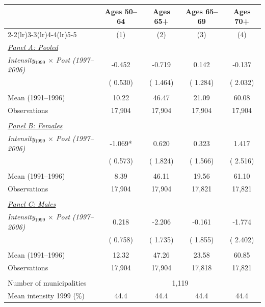 \begin{tabular}{lcccc} \hline \hline
& \multicolumn{1}{c}{Ages 50--64} & \multicolumn{1}{c}{Ages 65+} & \multicolumn{1}{c}{Ages 65--69} & \multicolumn{1}{c}{Ages 70+} \\ 
\cmidrule(lr){2-2}\cmidrule(lr){3-3}\cmidrule(lr){4-4}\cmidrule(lr){5-5}
& \multicolumn{1}{c}{(1)} & \multicolumn{1}{c}{(2)} & \multicolumn{1}{c}{(3)} & \multicolumn{1}{c}{(4)} \\ \toprule
\underline{\textit{Panel A: Pooled}} \\ 
\textit{Intensity$_{1999}$ $\times$ Post (1997--2006)} &       -0.452 &       -0.719 &        0.142 &       -0.137 \\ 
 & (       0.530) & (       1.464) & (       1.284) & (       2.032) \\ 
  & & & & \\ 
Mean (1991--1996) &        10.22 &        46.47 &        21.09 &        60.08 \\ 
Observations &       17,904 &       17,904 &       17,904 &       17,904 \\ 
  & & & & \\ 
\underline{\textit{Panel B: Females}} \\ 
\textit{Intensity$_{1999}$ $\times$ Post (1997--2006)} &       -1.069* &        0.620 &        0.323 &        1.417 \\ 
 & (       0.573) & (       1.824) & (       1.566) & (       2.516) \\ 
  & & & & \\ 
Mean (1991--1996) &         8.39 &        46.11 &        19.56 &        61.10 \\ 
Observations &       17,904 &       17,904 &       17,821 &       17,821 \\ 
  & & & & \\ 
\underline{\textit{Panel C: Males}} \\ 
\textit{Intensity$_{1999}$ $\times$ Post (1997--2006)} &        0.218 &       -2.206 &       -0.161 &       -1.774 \\ 
 & (       0.758) & (       1.735) & (       1.855) & (       2.402) \\ 
  & & & & \\ 
Mean (1991--1996) &        12.32 &        47.26 &        23.58 &        60.85 \\ 
Observations &       17,904 &       17,904 &       17,818 &       17,821 \\ 
  & & & & \\ 
Number of municipalities & \multicolumn{4}{c}{       1,119} \\ 
Mean intensity 1999 (\%) &   44.4 &   44.4 &   44.4 &   44.4 \\ 
\bottomrule
\end{tabular}